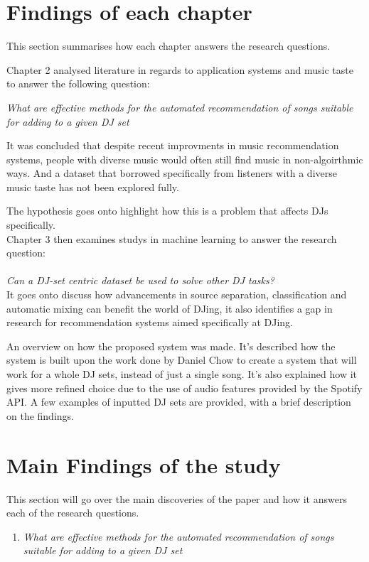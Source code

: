 \section{Findings of each chapter}
This section summarises how each chapter answers the research questions.

Chapter 2 analysed literature in regards to application systems and music taste to answer the following question: 

\textit{What are effective methods for the automated recommendation of songs suitable
	for adding to a given DJ set}

It was concluded that despite recent improvments in music recommendation systems, people with diverse music would often still find music in non-algoirthmic ways. And a dataset that borrowed specifically from listeners with a diverse music taste has not been explored fully.

The hypothesis goes onto highlight how this  is a problem that affects DJs specifically.
\\

Chapter 3 then examines studys in machine learning to answer the research question:
\\
\\
\textit{Can a DJ-set centric dataset be used to solve other DJ tasks?}
\\

It goes onto discuss how advancements in source separation, classification and automatic mixing can benefit the world of DJing, it also identifies a gap in research for recommendation systems aimed specifically at DJing.

An overview on how the proposed system was made. It's described how the system is built upon the work done by Daniel Chow to create a system that will work for a whole DJ sets, instead of just a single song. It's also explained how it gives more refined choice due to the use of audio features provided by the Spotify API. A few examples of inputted DJ sets are provided, with a brief description on the findings. 

\section{Main Findings of the study}

This section will go over the main discoveries of the paper and how it answers each of the research questions.

\begin{enumerate}
	\item \textit{What are effective methods for the automated recommendation of songs suitable
		for adding to a given DJ set}
\end{enumerate}

